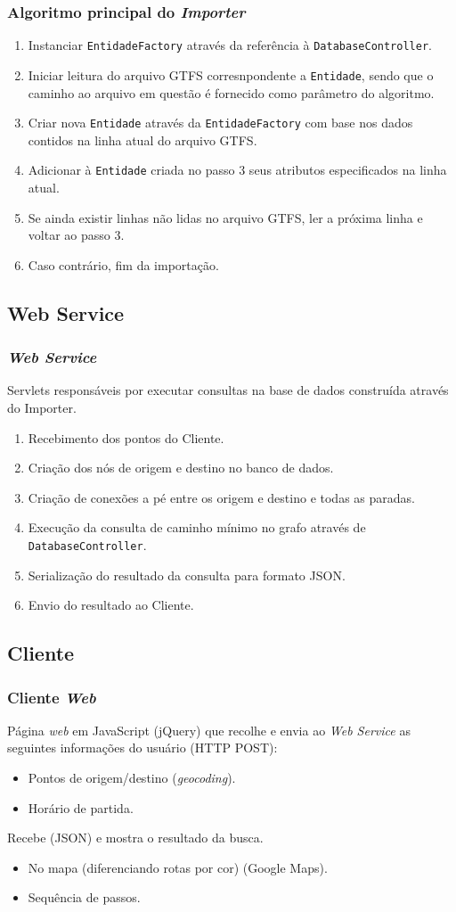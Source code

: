 \frame
{
\frametitle{Algoritmo principal do \emph{Importer}}
\begin{enumerate}
	\item Instanciar \texttt{EntidadeFactory} através da referência à \texttt{DatabaseController}.
	\item Iniciar leitura do arquivo GTFS corresnpondente a \texttt{Entidade}, sendo que o caminho ao arquivo em questão é fornecido como parâmetro do algoritmo.
	\item Criar nova \texttt{Entidade} através da \texttt{EntidadeFactory} com base nos dados contidos na linha atual do arquivo GTFS.
	\item Adicionar à \texttt{Entidade} criada no passo 3 seus atributos especificados na linha atual.
	\item Se ainda existir linhas não lidas no arquivo GTFS, ler a próxima linha e voltar ao passo 3.
	\item Caso contrário, fim da importação.
\end{enumerate}
}

\subsection{Web Service}
\frame
{
\frametitle{\emph{Web Service}}
Servlets responsáveis por executar consultas na base de dados construída através do Importer.

\begin{enumerate}
\item Recebimento dos pontos do Cliente.
\item Criação dos nós de origem e destino no banco de dados.
\item Criação de conexões a pé entre os origem e destino e todas as paradas.
\item Execução da consulta de caminho mínimo no grafo através de \texttt{DatabaseController}.
\item Serialização do resultado da consulta para formato JSON.
\item Envio do resultado ao Cliente.
\end{enumerate}
}

\subsection{Cliente}
\frame
{
\frametitle{Cliente \emph{Web}}
Página \emph{web} em JavaScript (jQuery) que recolhe e envia ao \emph{Web Service} as seguintes informações do usuário (HTTP POST):
\begin{itemize}
\item Pontos de origem/destino (\emph{geocoding}).
\item Horário de partida.
\end{itemize}
Recebe (JSON) e mostra o resultado da busca.
\begin{itemize}
\item No mapa (diferenciando rotas por cor) (Google Maps).
\item Sequência de passos.
\end{itemize}
}

